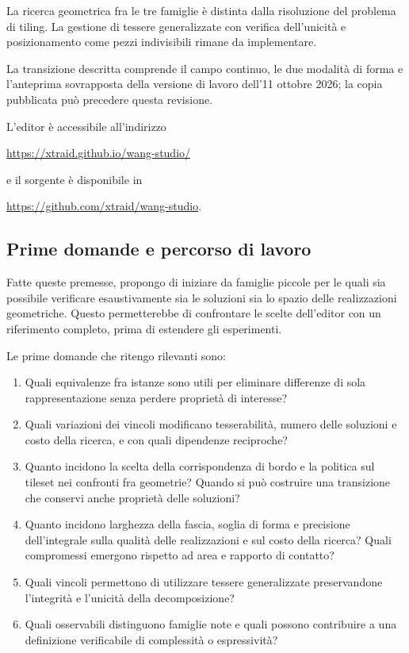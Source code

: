 \documentclass[11pt,a4paper]{article}
\begin{document}
La ricerca geometrica fra le tre famiglie è distinta dalla risoluzione del problema di tiling. La gestione di tessere generalizzate con verifica dell'unicità e posizionamento come pezzi indivisibili rimane da implementare.

La transizione descritta comprende il campo continuo, le due modalità di forma e l'anteprima sovrapposta della versione di lavoro dell'11 ottobre 2026; la copia pubblicata può precedere questa revisione.

L'editor è accessibile all'indirizzo
\begin{center}
\url{https://xtraid.github.io/wang-studio/}
\end{center}
e il sorgente è disponibile in
\begin{center}
\url{https://github.com/xtraid/wang-studio}.
\end{center}

\subsection{Prime domande e percorso di lavoro}

Fatte queste premesse, propongo di iniziare da famiglie piccole per le quali sia possibile verificare esaustivamente sia le soluzioni sia lo spazio delle realizzazioni geometriche. Questo permetterebbe di confrontare le scelte dell'editor con un riferimento completo, prima di estendere gli esperimenti.

Le prime domande che ritengo rilevanti sono:
\begin{enumerate}
\item Quali equivalenze fra istanze sono utili per eliminare differenze di sola rappresentazione senza perdere proprietà di interesse?
\item Quali variazioni dei vincoli modificano tesserabilità, numero delle soluzioni e costo della ricerca, e con quali dipendenze reciproche?
\item Quanto incidono la scelta della corrispondenza di bordo e la politica sul tileset nei confronti fra geometrie? Quando si può costruire una transizione che conservi anche proprietà delle soluzioni?
\item Quanto incidono larghezza della fascia, soglia di forma e precisione dell'integrale sulla qualità delle realizzazioni e sul costo della ricerca? Quali compromessi emergono rispetto ad area e rapporto di contatto?
\item Quali vincoli permettono di utilizzare tessere generalizzate preservandone l'integrità e l'unicità della decomposizione?
\item Quali osservabili distinguono famiglie note e quali possono contribuire a una definizione verificabile di complessità o espressività?
\end{enumerate}
\end{document}

